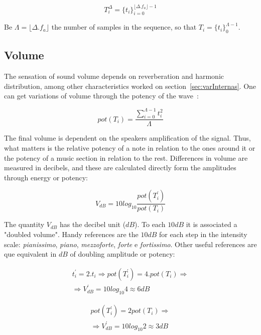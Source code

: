 \documentclass[
 aip,
 jmp,
 amsmath,amssymb,
 reprint,
]{revtex4-1}
\begin{document}
\begin{equation}\label{eq:dur}
T_{i}^{\Delta}={\{t_i\}}_{i=0}^{\lfloor \Delta . f_a \rfloor -1}
\end{equation}

Be $\Lambda=\lfloor \Delta . f_a \rfloor$ the number of samples in the sequence, so that $T_i=\{t_i\}_0^{\Lambda-1}$.

\subsection{Volume}\label{subsec:volume}
The sensation of sound volume depends on reverberation and harmonic distribution, among other characteristics worked on section~\ref{sec:varInternas}. One can get variations of volume through the potency of the wave~\cite{Chowning}:

\begin{equation}\label{eq:potencia}
pot(T_i)=\frac{\sum_{i=0}^{\Lambda -1} t_i^2}{\Lambda}
\end{equation} 

The final volume is dependent on the speakers amplification of the signal. Thus, what matters is the relative potency of a note in relation to the ones around it or the potency of a music section in relation to the rest. Differences in volume are measured in decibels, and these are calculated directly form the amplitudes through energy or potency:

\begin{equation}\label{decibels}
V_{dB}=10log_{10}\frac{pot(T^{'}_i)}{pot(T_i)}
\end{equation}

The quantity $V_{dB}$ has the decibel unit ($dB$). 
To each $10dB$ it is associated a "doubled volume".
Handy references are the $10dB$ for each step in the intensity scale: \emph{pianissimo}, \emph{piano}, \emph{mezzoforte}, \emph{forte} e \emph{fortissimo}. Other useful references are que equivalent in $dB$ of doubling amplitude or potency:

\begin{equation}\label{eq:ampVol}
\begin{split}
t_i^{'}=2 . t_i \Rightarrow pot(T^{'}_i)=4 . pot(T_i) \Rightarrow \\ \Rightarrow V^{'}_{dB}=10log_{10} 4 \approx 6 dB
\end{split}
\end{equation}

\begin{equation}\label{eq:potVol}
\begin{split}
pot(T^{'}_i)=2 pot(T_i) \Rightarrow \\ \Rightarrow V^{'}_{dB}=10log_{10} 2 \approx 3 dB
\end{split}
\end{equation}
\end{document}
